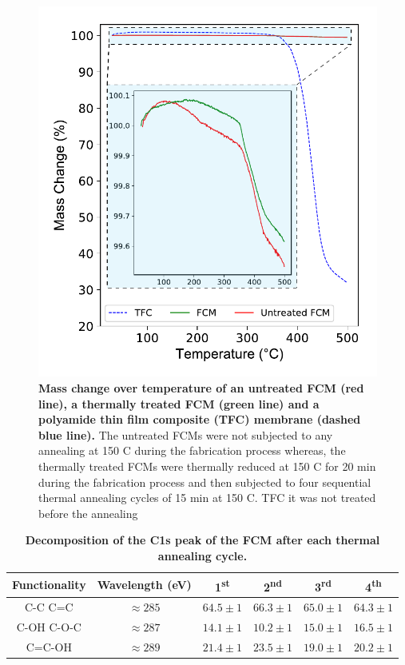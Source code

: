 \begin{figure}
  \centering
  \includegraphics[width=5in]{paper5/FigS8.pdf}
  \caption{\textbf{Mass change over temperature of an untreated FCM (red line), a thermally treated FCM (green line) and a polyamide thin film composite (TFC) membrane (dashed blue line).} The untreated FCMs were not subjected to any annealing at 150 \textdegree C during the fabrication process whereas, the thermally treated FCMs were thermally reduced at 150 \textdegree C for 20 min during the fabrication process and then subjected to four sequential thermal annealing cycles of 15 min at 150 \textdegree C. TFC it was not treated before the annealing}
  \label{figS8_AppD}
\end{figure}

\begin{table}[h]
 \begin{center}
 \caption{\textbf{Decomposition of the C1s peak of the FCM after each thermal annealing cycle.}}
  \label{tblS1_AppD}
  \begin{tabular}{cccccc}
        \hline
        Functionality & Wavelength (eV) & 1\textsuperscript{st} & 2\textsuperscript{nd} & 3\textsuperscript{rd} & 4\textsuperscript{th}\\
        \hline
        C-C C=C & $\approx285$ & $64.5\pm1$ & $66.3\pm1$ & $65.0\pm1$ & $64.3\pm1$\\
        C-OH C-O-C & $\approx287$ & $14.1\pm1$ & $10.2\pm1$ & $15.0\pm1$ & $16.5\pm1$\\
        C=C-OH & $\approx289$ & $21.4\pm1$ & $23.5\pm1$ & $19.0\pm1$ & $20.2\pm1$\\
        \hline
  \end{tabular}
 \end{center}
 \small
\end{table}







